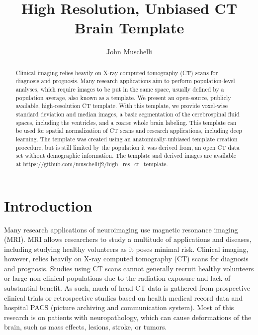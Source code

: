 \documentclass[]{elsarticle} %
\begin{document}
\begin{frontmatter}

  \title{High Resolution, Unbiased CT Brain Template}
    \author[JHSPH]{John Muschelli}
      \address[JHSPH]{Johns Hopkins Bloomberg School of Public Health, Department of Biostatistics, 615 N Wolfe St, Baltimore, MD, 21205}
    
  \begin{abstract}
  Clinical imaging relies heavily on X-ray computed tomography (CT) scans for diagnosis and prognosis. Many research applications aim to perform population-level analyses, which require images to be put in the same space, usually defined by a population average, also known as a template. We present an open-source, publicly available, high-resolution CT template. With this template, we provide voxel-wise standard deviation and median images, a basic segmentation of the cerebrospinal fluid spaces, including the ventricles, and a coarse whole brain labeling. This template can be used for spatial normalization of CT scans and research applications, including deep learning. The template was created using an anatomically-unbiased template creation procedure, but is still limited by the population it was derived from, an open CT data set without demographic information. The template and derived images are available at https://github.com/muschellij2/high\_res\_ct\_template.
  \end{abstract}
  
 \end{frontmatter}

\hypertarget{introduction}{%
\section{Introduction}\label{introduction}}

Many research applications of neuroimaging use magnetic resonance imaging (MRI). MRI allows researchers to study a multitude of applications and diseases, including studying healthy volunteers as it poses minimal risk. Clinical imaging, however, relies heavily on X-ray computed tomography (CT) scans for diagnosis and prognosis. Studies using CT scans cannot generally recruit healthy volunteers or large non-clinical populations due to the radiation exposure and lack of substantial benefit. As such, much of head CT data is gathered from prospective clinical trials or retrospective studies based on health medical record data and hospital PACS (picture archiving and communication system). Most of this research is on patients with neuropathology, which can cause deformations of the brain, such as mass effects, lesions, stroke, or tumors.
\end{document}
